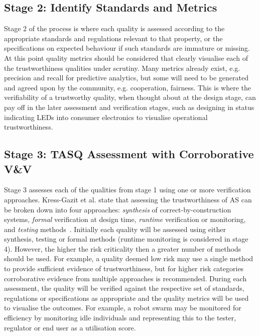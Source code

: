 \subsection{Stage 2: Identify Standards and Metrics}

Stage 2 of the process is where each quality is assessed according to the appropriate standards and regulations relevant to that property, or the specifications on expected behaviour if such standards are immature or missing. 
%
At this point quality metrics should be considered that clearly visualise each of the trustworthiness qualities under scrutiny. 
%
Many metrics already exist, e.g. precision and recall for predictive analytics, but some will need to be generated and agreed upon by the community, e.g. cooperation, fairness. 
%
This is where the verifiability of a trustworthy quality, when thought about at the design stage, can pay off in the later assessment and verification stages, such as designing in status indicating LEDs into consumer electronics to visualise operational trustworthiness. 


\subsection{Stage 3: TASQ Assessment with Corroborative V\&V}

Stage 3 assesses each of the qualities from stage 1 using one or more verification approaches. 
%
Kress-Gazit et al. state that assessing the trustworthiness of AS can be broken down into four approaches: \emph{synthesis} of correct-by-construction systems, \emph{formal} verification at design time, \emph{runtime} verification or monitoring, and \emph{testing} methods~\cite{kress2021formalizing}. 
%
Initially each quality will be assessed using either synthesis, testing or formal methods (runtime monitoring is considered in stage 4). However, the higher the risk criticality then a greater number of methods should be used. For example, a quality deemed low risk may use a single method to provide sufficient evidence of trustworthiness, but for higher risk categories corroborative evidence from multiple approaches is recommended. 
%
During each assessment, the quality will be verified against the respective set of standards, regulations or specifications as appropriate and the quality metrics will be used to visualise the outcomes. 
%
For example, a robot swarm may be monitored for efficiency by monitoring idle individuals and representing this to the tester, regulator or end user as a utilisation score. 




